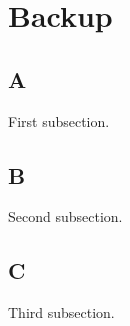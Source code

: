 % 

\section{Backup} 

\subsection{A}
First subsection.

\subsection{B}
Second subsection.

\subsection{C}
Third subsection.
	
\endinput  %
